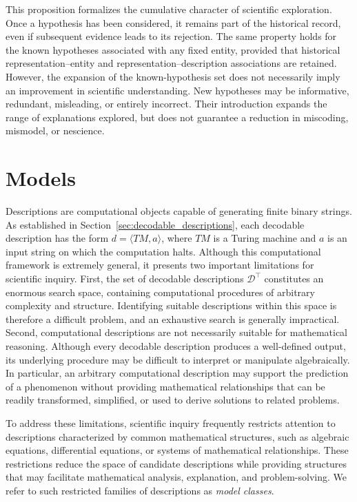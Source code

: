 This proposition formalizes the cumulative character of scientific exploration. Once a hypothesis has been considered, it remains part of the historical record, even if subsequent evidence leads to its rejection. The same property holds for the known hypotheses associated with any fixed entity, provided that historical representation--entity and representation--description associations are retained. However, the expansion of the known-hypothesis set does not necessarily imply an improvement in scientific understanding. New hypotheses may be informative, redundant, misleading, or entirely incorrect. Their introduction expands the range of explanations explored, but does not guarantee a reduction in miscoding, mismodel, or nescience.

%
%

\section{Models}
\label{sec:models}

Descriptions are computational objects capable of generating finite binary strings. As established in Section~\ref{sec:decodable_descriptions}, each decodable description has the form $d=\langle TM,a\rangle$, where $TM$ is a Turing machine and $a$ is an input string on which the computation halts. Although this computational framework is extremely general, it presents two important limitations for scientific inquiry. First, the set of decodable descriptions $\mathcal{D}^\top$ constitutes an enormous search space, containing computational procedures of arbitrary complexity and structure. Identifying suitable descriptions within this space is therefore a difficult problem, and an exhaustive search is generally impractical. Second, computational descriptions are not necessarily suitable for mathematical reasoning. Although every decodable description produces a well-defined output, its underlying procedure may be difficult to interpret or manipulate algebraically. In particular, an arbitrary computational description may support the prediction of a phenomenon without providing mathematical relationships that can be readily transformed, simplified, or used to derive solutions to related problems.

To address these limitations, scientific inquiry frequently restricts attention to descriptions characterized by common mathematical structures, such as algebraic equations, differential equations, or systems of mathematical relationships. These restrictions reduce the space of candidate descriptions while providing structures that may facilitate mathematical analysis, explanation, and problem-solving. We refer to such restricted families of descriptions as \emph{model classes}.

